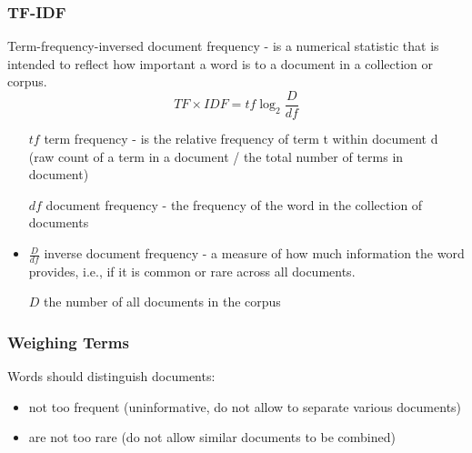 \documentclass[svgnames]{beamer}
\begin{document}
\begin{frame}
  \frametitle{TF-IDF}
  Term-frequency-inversed document frequency - is a numerical statistic that is intended to reflect how important a word is to a document in a collection or corpus.
  \begin{equation}
    TF \times IDF = tf\log_2\frac{D}{df}
  \end{equation}
  \begin{itemize}
  \item[$tf$]  term frequency - is the relative frequency of term t within document d (raw count of a term in a document / the total number of terms in document)
  \item[$df$] document frequency - the frequency of the word in the collection of documents
  \item $\frac{D}{df}$ inverse document frequency - a measure of how much information the word provides, i.e., if it is common or rare across all documents.
  \item[$D$] the number of all documents in the corpus
  \end{itemize}
\end{frame}


\begin{frame}
  \frametitle{Weighing Terms}
  Words should \alert{distinguish} documents:
  \begin{itemize}
  \item not too frequent (uninformative, do not allow to separate
    various documents)
  \item are not too rare (do not allow similar documents to be combined)
  \end{itemize}
\end{frame}

\end{document}
